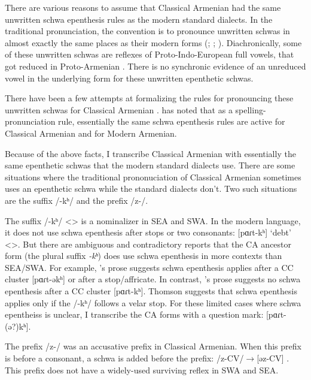 There are various reasons to assume that Classical Armenian had the same unwritten schwa epenthesis rules as the modern standard dialects. In the traditional pronunciation, the convention is to pronounce unwritten schwas in almost exactly the same places as their modern forms (\citealt[16]{Godel-1975-IntroClassicalArmenian}; \citealt[116]{Thomson-1989-IntroClassicalArmenian}; \citealt[1043]{Macak-2017-PhonoClassicalArmenian}). Diachronically, some of these unwritten schwas are reflexes of Proto-Indo-European full vowels, that got reduced in Proto-Armenian \citep[26]{Vaux-1998-ArmenianPhono}. There is no synchronic evidence of an unreduced vowel in the underlying form for these unwritten epenthetic schwas.

There have been a few attempts at formalizing the rules for pronouncing these unwritten schwas for Classical Armenian \citep{Hammalian-1984-PhonoOldArmenian,Schwink-1994-ArmenianSchwaLexicalized,Pierce-2007-SchwaClassicalArmenian}. \citet{Pierce-2007-SchwaClassicalArmenian} has noted that as a spelling-pronunciation rule, essentially the same schwa epenthesis rules are active for Classical Armenian and for Modern Armenian.

Because of the above facts, I transcribe Classical Armenian with essentially the same epenthetic schwas that the modern standard dialects use. There are some situations where the traditional prononuciation of Classical Armenian sometimes uses an epenthetic schwa while the standard dialects don't. Two such situations are the suffix /-kʰ/ and the prefix /z-/. 

The suffix /-kʰ/ <> is a nominalizer in SEA and SWA. In the modern language, it does not use schwa epenthesis after stops or two consonants: [pɑɾt-kʰ] `debt' <>. But there are ambiguous and contradictory reports that the CA ancestor form (the plural suffix \textit{-kʰ}) does use schwa epenthesis in more contexts than SEA/SWA. For example, \citet[18-19]{Godel-1975-IntroClassicalArmenian}'s prose suggests schwa epenthesis applies after a CC cluster [pɑɾt-əkʰ] or after a stop/affricate. In contrast, \citet[120]{Thomson-1989-IntroClassicalArmenian}'s prose suggests no schwa epenthesis after a CC cluster [pɑɾt-kʰ]. Thomson suggests that schwa epenthesis applies only if the /-kʰ/ follows a velar stop. For these limited cases where schwa epentheiss is unclear, I transcribe the CA forms with a question mark: [pɑɾt-(ə?)kʰ]. 

The prefix /z-/ was an accusative prefix in Classical Armenian. When this prefix is before a consonant, a schwa is added before the prefix: /z-CV/$\rightarrow$[əz-CV] \citep[116]{Thomson-1989-IntroClassicalArmenian}. This prefix does not have a widely-used surviving reflex in SWA and SEA.


